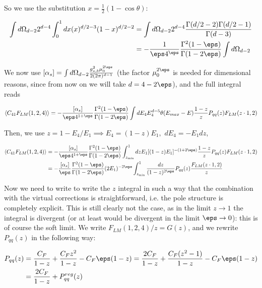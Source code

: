 \documentclass[11pt]{report}
\begin{document}
So we use the substitution \(x = \frac{1}{2}(1-\cos\theta)\): 

\begin{align}
    \int d\Omega_{d-2} 2^{d-4}\int_0^1 dx (x)^{d/2-3}(1-x)^{d/2-2} &= \int d\Omega_{d-2}2^{d-4}\frac{\Gamma(d/2-2)\Gamma(d/2-1)}{\Gamma(d-3)} \notag \\ 
    &= -\frac{1}{\eps 4^{\eps}}\frac{\Gamma^2(1-\eps)}{\Gamma(1-2\eps)}\int d\Omega_{d-2}
\end{align}

We now use \([\alpha_s] = \int d\Omega_{d-2}\frac{g_{s, b}^2\mu_0^{2\eps}}{2(2\pi)^{d-1}}\) (the factor \(\mu_0^{2\eps}\) is needed for dimensional reasons, since from now on we will take \(d = 4-2\eps\)), and the full integral reads

\begin{align}
    \braket{C_{41}F_{LM}(1,2, 4)} = -\frac{[\alpha_s]}{\eps 4^{1+\eps}}\frac{\Gamma^2(1-\eps)}{\Gamma(1-2\eps)}\int dE_4  E_4^{d-5}\theta(E_{max} - E)\frac{1-z}{z}P_{qq}(z)F_{LM}(z\cdot 1, 2)
\end{align}

Then, we use \(z = 1-E_4/E_1 \implies E_4 = (1-z)E_1, \, \,  dE_4 = -E_1 dz \), 

\begin{align}
    \label{eq:collzintegral}
    \braket{C_{41}F_{LM}(1,2, 4)} &= -\frac{[\alpha_s]}{\eps 4^{1+\eps}}\frac{\Gamma^2(1-\eps)}{\Gamma(1-2\eps)}\int_{z_{\min}}^1 dz E_1  [(1-z)E_1]^{-(1+2\eps)}\frac{1-z}{z}P_{qq}(z)F_{LM}(z\cdot 1, 2) \notag \\ 
    &= -\frac{[\alpha_s]}{\eps}\frac{\Gamma^2(1-\eps)}{\Gamma(1-2\eps)}(2E_1)^{-2\eps}\int_{z_{\min}}^1 \frac{dz}{(1-z)^{2\eps}}P_{qq}(z) \frac{F_{LM}(z\cdot 1, 2)}{z}
\end{align}

Now we need to write to write the \(z\) integral in such a way that the combination with the virtual corrections is straightforward, i.e. the pole structure is completely explicit. This is still clearly not the case, as in the limit \(z\to 1\) the integral is divergent (or at least would be divergent in the limit \(\eps \to 0\)): this is of course the soft limit. We write \(F_{LM}(1,2,4)/z = G(z)\), and we rewrite \(P_{qq}(z)\) in the following way:  

\begin{align}
    P_{qq}(z) &= \frac{C_F}{1-z} + \frac{C_F z^2}{1-z} - C_F\eps(1-z) = \frac{2C_F}{1-z} + \frac{C_F(z^2 -1)}{1-z} -C_F\eps(1-z) \notag \\ 
    &= \frac{2C_F}{1-z} + P_{qq}^{reg}(z)
\end{align}
\end{document}
